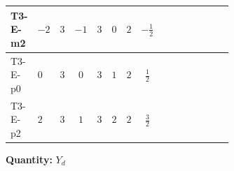 \documentclass[8pt]{article}
\begin{document}
\begin{landscape}
\begin{longtable}{@{}llcccccc >{\raggedright\arraybackslash}p{0.21\linewidth} >{\raggedright\arraybackslash}p{0.21\linewidth} >{\raggedright\arraybackslash}p{0.21\linewidth}@{}}
\midrule
T3-E-m2 & $-2$ & $3$ & $-1$ & $3$ & $0$ & $2$ & $-\frac{1}{2}$ & \scriptsize\adjustbox{max width=\linewidth}{$\begin{gathered} \operatorname{Tr}\!\left({Y_e}\,\left({Y_e}\right)^{\dagger}\right) \left({Y_d}\right)_{ij}\end{gathered}$} & \scriptsize\adjustbox{max width=\linewidth}{$\begin{gathered} +3 \operatorname{Tr}\!\left({Y_u}\,\left({Y_u}\right)^{\dagger}\right) \left({Y_d}\right)_{ij}\end{gathered}$} & \scriptsize\adjustbox{max width=\linewidth}{$\begin{gathered} +3 \operatorname{Tr}\!\left({Y_d}\,\left({Y_d}\right)^{\dagger}\right) \left({Y_d}\right)_{ij}\end{gathered}$} \\
\midrule
T3-E-p0 & $0$ & $3$ & $0$ & $3$ & $1$ & $2$ & $\frac{1}{2}$ & \scriptsize\adjustbox{max width=\linewidth}{$\begin{gathered} \operatorname{Tr}\!\left({Y_e}\,\left({Y_e}\right)^{\dagger}\right) \left({Y_d}\right)_{ij}\end{gathered}$} & \scriptsize\adjustbox{max width=\linewidth}{$\begin{gathered} +3 \operatorname{Tr}\!\left({Y_u}\,\left({Y_u}\right)^{\dagger}\right) \left({Y_d}\right)_{ij}\end{gathered}$} & \scriptsize\adjustbox{max width=\linewidth}{$\begin{gathered} +3 \operatorname{Tr}\!\left({Y_d}\,\left({Y_d}\right)^{\dagger}\right) \left({Y_d}\right)_{ij}\end{gathered}$} \\
\midrule
T3-E-p2 & $2$ & $3$ & $1$ & $3$ & $2$ & $2$ & $\frac{3}{2}$ & \scriptsize\adjustbox{max width=\linewidth}{$\begin{gathered} \operatorname{Tr}\!\left({Y_e}\,\left({Y_e}\right)^{\dagger}\right) \left({Y_d}\right)_{ij}\end{gathered}$} & \scriptsize\adjustbox{max width=\linewidth}{$\begin{gathered} +3 \operatorname{Tr}\!\left({Y_u}\,\left({Y_u}\right)^{\dagger}\right) \left({Y_d}\right)_{ij}\end{gathered}$} & \scriptsize\adjustbox{max width=\linewidth}{$\begin{gathered} +3 \operatorname{Tr}\!\left({Y_d}\,\left({Y_d}\right)^{\dagger}\right) \left({Y_d}\right)_{ij}\end{gathered}$} \\
\midrule
\bottomrule
\end{longtable}
\clearpage
\noindent\textbf{Quantity: }$Y_d$\par\smallskip

\end{landscape}
\end{document}
